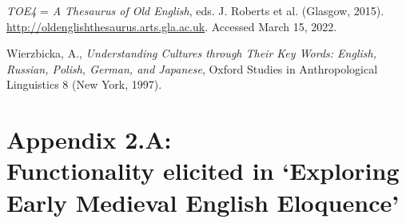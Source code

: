 \begin{list}{}
\item %
\textit{TOE4} = \textit{A Thesaurus of Old English}, eds. J. Roberts et al. (Glasgow, 2015). \url{http://oldenglishthesaurus.arts.gla.ac.uk}. Accessed March 15, 2022.








\item %
Wierzbicka, A., \textit{Understanding Cultures through Their Key Words: English, Russian, Polish, German, and Japanese}, Oxford Studies in Anthropological Linguistics 8 (New York, 1997).

\end{list}


\newpage
\section*{Appendix 2.A:\\Functionality elicited in `Exploring Early Medieval English Eloquence'}
\label{Appendix2.A}

\begingroup
\renewcommand{\thefigure}{2.A.\arabic{figure}}
\setcounter{figure}{0}
\renewcommand{\thetable}{2.A.\arabic{table}}
\setcounter{table}{0}

